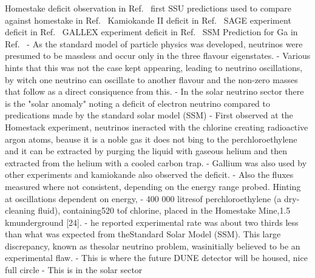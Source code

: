 Homestake deficit observation in Ref.~\cite{davis1968}
first SSU predictions used to compare against homestake in Ref.~\cite{bahcall1968}
Kamiokande II deficit in Ref.~\cite{hirata1989}
SAGE experiment deficit in Ref.~\cite{abazov1991}
GALLEX experiment deficit in Ref.~\cite{anselmann1994}
SSM Prediction for Ga in Ref.~\cite{bahcall1988}
- As the standard model of particle physics was developed, neutrinos were presumed to be massless and occur only in the three flavour eigenstates.
- Various hints that this was not the case kept appearing, leading to neutrino oscillations, by witch one neutrino can oscillate to another flavour and the non-zero masses that follow as a direct consiquence from this.
- In the solar neutrino sector there is the "solar anomaly" noting a deficit of electron neutrino compared to predications made by the standard solar model (SSM)
- First observed at the Homestack experiment, neutrinos ineracted with the chlorine creating radioactive argon atoms, beause it is a noble gas it does not bing to the perchloroethylene and it can be extracted by purging the liquid with gaseous helium and then extracted from the helium with a cooled carbon trap.
- Gallium was also used by other experiments and kamiokande also observed the deficit.
- Also the fluxes measured where not consistent, depending on the energy range probed. Hinting at oscillations dependent on energy,
- 400 000 litresof perchloroethylene (a dry-cleaning fluid), containing520 tof chlorine, placed in the Homestake Mine,1.5 kmunderground [24].
- he reported experimental rate was about two thirds less than what was expected from theStandard Solar Model (SSM). This large discrepancy, known as thesolar  neutrino  problem, wasinitially believed to be an experimental flaw.
- This is where the future DUNE detector will be housed, nice full circle
- This is in the solar sector

